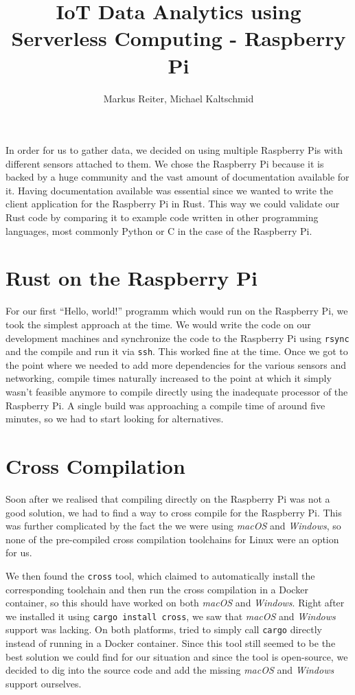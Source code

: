 \documentclass{article}
\title{IoT Data Analytics using Serverless Computing - Raspberry Pi}
\author{Markus Reiter, Michael Kaltschmid}
\date{}
\begin{document}
  \maketitle

  In order for us to gather data, we decided on using multiple Raspberry Pis with different sensors attached to them. We chose the Raspberry Pi because it is backed by a huge community and the vast amount of documentation available for it. Having documentation available was essential since we wanted to write the client application for the Raspberry Pi in Rust. This way we could validate our Rust code by comparing it to example code written in other programming languages, most commonly Python or C in the case of the Raspberry Pi.

  \section{Rust on the Raspberry Pi}

  For our first “Hello, world!” programm which would run on the Raspberry Pi, we took the simplest approach at the time. We would write the code on our development machines and synchronize the code to the Raspberry Pi using \texttt{rsync} and the compile and run it via \texttt{ssh}. This worked fine at the time. Once we got to the point where we needed to add more dependencies for the various sensors and networking, compile times naturally increased to the point at which it simply wasn't feasible anymore to compile directly using the inadequate processor of the Raspberry Pi. A single build was approaching a compile time of around five minutes, so we had to start looking for alternatives.

  \section{Cross Compilation}

  Soon after we realised that compiling directly on the Raspberry Pi was not a good solution, we had to find a way to cross compile for the Raspberry Pi. This was further complicated by the fact the we were using \textit{macOS} and \textit{Windows}, so none of the pre-compiled cross compilation toolchains for Linux were an option for us.

  We then found the \texttt{cross} tool, which claimed to automatically install the corresponding toolchain and then run the cross compilation in a Docker container, so this should have worked on both \textit{macOS} and \textit{Windows}. Right after we installed it using \texttt{cargo install cross}, we saw that \textit{macOS} and \textit{Windows} support was lacking. On both platforms, tried to simply call \texttt{cargo} directly instead of running in a Docker container. Since this tool still seemed to be the best solution we could find for our situation and since the tool is open-source, we decided to dig into the source code and add the missing \textit{macOS} and \textit{Windows} support ourselves.
\end{document}
